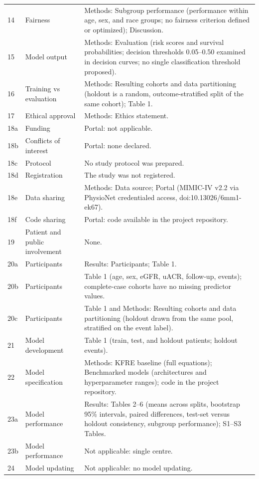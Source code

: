 \documentclass[9pt]{extarticle}
\begin{document}
\begin{longtable}{@{}p{}p{}p{}@{}}
14 & Fairness & Methods: Subgroup performance (performance within age, sex, and race groups; no fairness criterion defined or optimized); Discussion. \\
15 & Model output & Methods: Evaluation (risk scores and survival probabilities; decision thresholds 0.05--0.50 examined in decision curves; no single classification threshold proposed). \\
16 & Training vs evaluation & Methods: Resulting cohorts and data partitioning (holdout is a random, outcome-stratified split of the same cohort); Table 1. \\
17 & Ethical approval & Methods: Ethics statement. \\
18a & Funding & Portal: not applicable. \\
18b & Conflicts of interest & Portal: none declared. \\
18c & Protocol & No study protocol was prepared. \\
18d & Registration & The study was not registered. \\
18e & Data sharing & Methods: Data source; Portal (MIMIC-IV v2.2 via PhysioNet credentialed access, doi:10.13026/6mm1-ek67). \\
18f & Code sharing & Portal: code available in the project repository. \\
19 & Patient and public involvement & None. \\
20a & Participants & Results: Participants; Table 1. \\
20b & Participants & Table 1 (age, sex, eGFR, uACR, follow-up, events); complete-case cohorts have no missing predictor values. \\
20c & Participants & Table 1 and Methods: Resulting cohorts and data partitioning (holdout drawn from the same pool, stratified on the event label). \\
21 & Model development & Table 1 (train, test, and holdout patients; holdout events). \\
22 & Model specification & Methods: KFRE baseline (full equations); Benchmarked models (architectures and hyperparameter ranges); code in the project repository. \\
23a & Model performance & Results: Tables 2--6 (means across splits, bootstrap 95\% intervals, paired differences, test-set versus holdout consistency, subgroup performance); S1--S3 Tables. \\
23b & Model performance & Not applicable: single centre. \\
24 & Model updating & Not applicable: no model updating. \\

\end{longtable}
\end{document}
